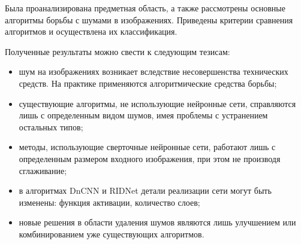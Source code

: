 Была проанализирована предметная область, а также рассмотрены основные алгоритмы борьбы с шумами в изображениях.
Приведены критерии сравнения алгоритмов и осуществлена их классификация.

Полученные результаты можно свести к следующим тезисам:
\begin{itemize}
	\item шум на изображениях возникает вследствие несовершенства технических средств. На практике применяются алгоритмические средства борьбы;
	\item существующие алгоритмы, не использующие нейронные сети, справляются лишь с определенным видом шумов, имея проблемы с устранением остальных типов;
	\item методы, использующие сверточные нейронные сети, работают лишь с определенным размером входного изображения, при этом не производя сглаживание;
	\item в алгоритмах DnCNN и RIDNet детали реализации сети могут быть изменены: функция активации, количество слоев;
	\item новые решения в области удаления шумов являются лишь улучшением или комбинированием уже существующих алгоритмов.
\end{itemize}